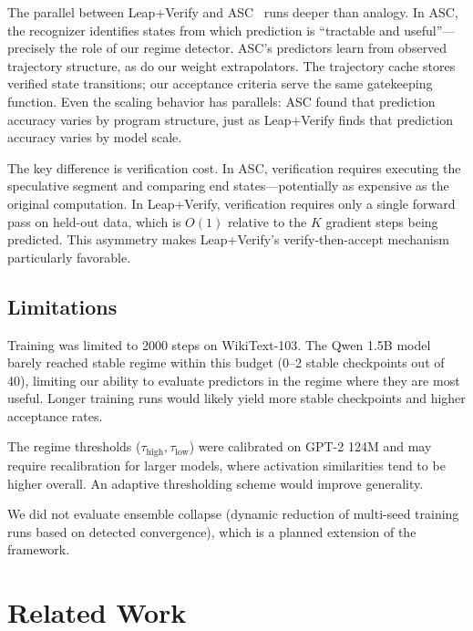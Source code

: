 \documentclass{article}
\begin{document}
The parallel between Leap+Verify and ASC~\citep{waterland2014asc} runs deeper than analogy.
In ASC, the recognizer identifies states from which prediction is ``tractable and useful''---precisely the role of our regime detector.
ASC's predictors learn from observed trajectory structure, as do our weight extrapolators.
The trajectory cache stores verified state transitions; our acceptance criteria serve the same gatekeeping function.
Even the scaling behavior has parallels: ASC found that prediction accuracy varies by program structure, just as Leap+Verify finds that prediction accuracy varies by model scale.

The key difference is verification cost.
In ASC, verification requires executing the speculative segment and comparing end states---potentially as expensive as the original computation.
In Leap+Verify, verification requires only a single forward pass on held-out data, which is $O(1)$ relative to the $K$ gradient steps being predicted.
This asymmetry makes Leap+Verify's verify-then-accept mechanism particularly favorable.

\subsection{Limitations}

Training was limited to 2000 steps on WikiText-103.
The Qwen 1.5B model barely reached stable regime within this budget (0--2 stable checkpoints out of 40), limiting our ability to evaluate predictors in the regime where they are most useful.
Longer training runs would likely yield more stable checkpoints and higher acceptance rates.

The regime thresholds ($\tau_{\text{high}}, \tau_{\text{low}}$) were calibrated on GPT-2 124M and may require recalibration for larger models, where activation similarities tend to be higher overall.
An adaptive thresholding scheme would improve generality.

We did not evaluate ensemble collapse (dynamic reduction of multi-seed training runs based on detected convergence), which is a planned extension of the framework.

\section{Related Work}
\label{sec:related}
\end{document}
